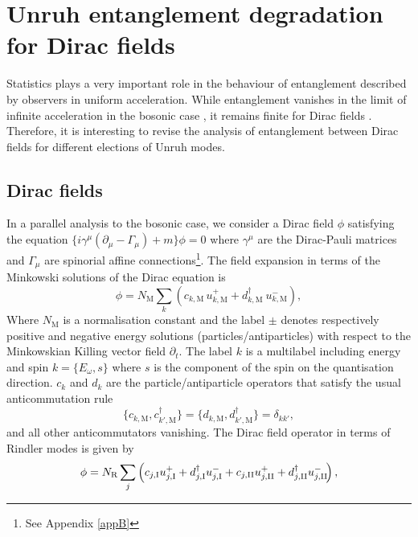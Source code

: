 \section{Unruh  entanglement degradation for Dirac fields}\label{secferme}

 Statistics plays a very important role in the behaviour of entanglement described by observers in uniform acceleration. While entanglement vanishes in the limit of infinite acceleration in the bosonic case \cite{Alicefalls}, it remains finite for Dirac fields \cite{AlsingSchul}. Therefore, it is interesting to revise the analysis of entanglement between Dirac fields for different elections of Unruh modes.
\subsection{Dirac fields}
In a parallel analysis to the bosonic case, we consider a Dirac field $\phi$ satisfying the
equation  $\{i\gamma^{\mu}(\partial_{\mu}-\Gamma_{\mu})+m\}\phi=0$
where $\gamma^{\mu}$ are the Dirac-Pauli matrices and $\Gamma_{\mu}$ are spinorial
affine connections\footnote{See Appendix \ref{appB}}. The field expansion in terms of the Minkowski solutions of the Dirac equation is
\begin{equation}\label{fermfieldminm7}
\phi=N_\text{M}\sum_k\left(c_{k,\text{M}}\, u^+_{k,\text{M}}+ d_{k,\text{M}}^\dagger \ u^-_{k,\text{M}}\right),
\end{equation}
Where $N_\text{M}$ is a normalisation constant and the label $\pm$  denotes respectively positive and negative energy solutions (particles/antiparticles) with respect to the Minkowskian Killing vector field $\partial_{t}$. The label $k$ is a multilabel including energy and spin $k=\{E_\omega,s\}$ where $s$ is the component of the spin on the quantisation direction. $c_k$ and $d_k$ are the particle/antiparticle operators that satisfy the usual anticommutation rule
\begin{equation}
\{c_{k,\text{M}},c_{k',\text{M}}^\dagger\}=\{ d_{k,\text{M}},d_{k',\text{M}}^\dagger\}=\delta_{kk'},
\end{equation}
and all other anticommutators vanishing. The Dirac field operator in terms of Rindler modes is given by
\begin{equation}\label{fermfieldm7}
\phi=N_\text{\text{R}}\sum_j\left(c_{j,\text{I}} u^+_{j,\text{I}}+ d_{j,\text{I}}^\dagger u^-_{j,\text{I}}+c_{j,\text{II}} u^+_{j,\text{II}}+ d_{j,\text{II}}^\dagger  u^-_{j,\text{II}}\!\right),
\end{equation}
